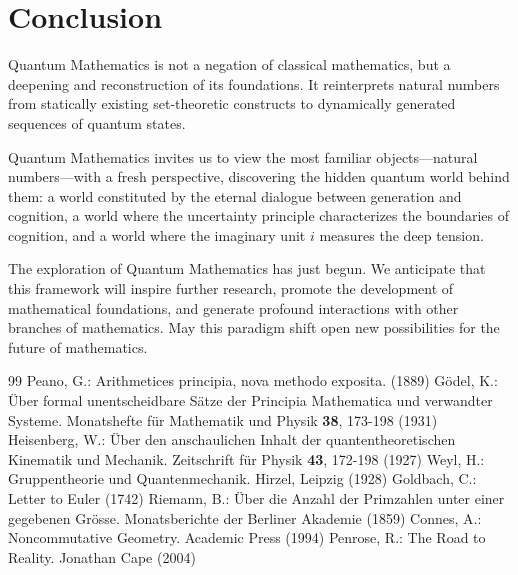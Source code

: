 \documentclass[12pt]{article}
\theoremstyle{definition}
\begin{document}
\section*{Conclusion}

Quantum Mathematics is not a negation of classical mathematics, but a deepening and reconstruction of its foundations. It reinterprets natural numbers from statically existing set-theoretic constructs to dynamically generated sequences of quantum states.

Quantum Mathematics invites us to view the most familiar objects—natural numbers—with a fresh perspective, discovering the hidden quantum world behind them: a world constituted by the eternal dialogue between generation and cognition, a world where the uncertainty principle characterizes the boundaries of cognition, and a world where the imaginary unit \(i\) measures the deep tension.

The exploration of Quantum Mathematics has just begun. We anticipate that this framework will inspire further research, promote the development of mathematical foundations, and generate profound interactions with other branches of mathematics. May this paradigm shift open new possibilities for the future of mathematics.


\begin{thebibliography}{99}
 Peano, G.: Arithmetices principia, nova methodo exposita. (1889)
 G\"odel, K.: \"Uber formal unentscheidbare S\"atze der Principia Mathematica und verwandter Systeme. Monatshefte f\"ur Mathematik und Physik \textbf{38}, 173-198 (1931)
 Heisenberg, W.: \"Uber den anschaulichen Inhalt der quantentheoretischen Kinematik und Mechanik. Zeitschrift f\"ur Physik \textbf{43}, 172-198 (1927)
 Weyl, H.: Gruppentheorie und Quantenmechanik. Hirzel, Leipzig (1928)
 Goldbach, C.: Letter to Euler (1742)
 Riemann, B.: \"Uber die Anzahl der Primzahlen unter einer gegebenen Gr\"osse. Monatsberichte der Berliner Akademie (1859)
 Connes, A.: Noncommutative Geometry. Academic Press (1994)
 Penrose, R.: The Road to Reality. Jonathan Cape (2004)
\end{thebibliography}
\end{document}
